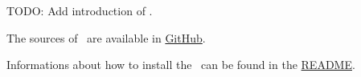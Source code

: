 %



%

TODO: Add introduction of \pkg.

The sources of \pkg\ are available in \href{https://github.com/test-fullautomation/python-microservice-base}{GitHub}.

Informations about how to install the \pkg\ can be found in the \href{https://github.com/test-fullautomation/python-microservice-base/blob/develop/README.rst}{README}.

